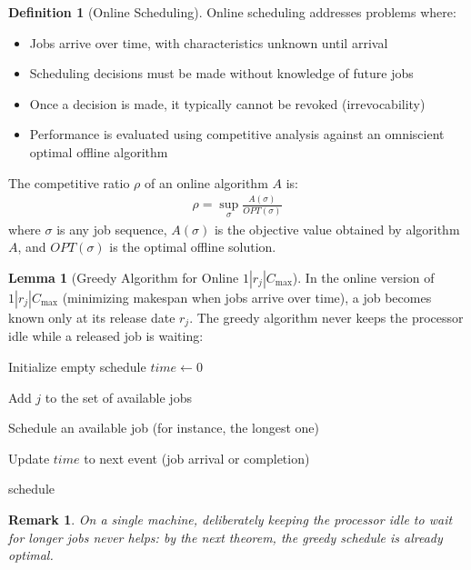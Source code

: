 \documentclass{article}
\newtheorem{remark}{Remark}
\theoremstyle{definition}
\newtheorem{lemma}{Lemma}
\newtheorem{definition}{Definition}
\begin{document}
\begin{definition}[Online Scheduling]
Online scheduling addresses problems where:
\begin{itemize}
    \item Jobs arrive over time, with characteristics unknown until arrival
    \item Scheduling decisions must be made without knowledge of future jobs
    \item Once a decision is made, it typically cannot be revoked (irrevocability)
    \item Performance is evaluated using competitive analysis against an omniscient optimal offline algorithm
\end{itemize}

The competitive ratio $\rho$ of an online algorithm $A$ is:
\begin{align}
\rho = \sup_{\sigma} \frac{A(\sigma)}{OPT(\sigma)}
\end{align}
where $\sigma$ is any job sequence, $A(\sigma)$ is the objective value obtained by algorithm $A$, and $OPT(\sigma)$ is the optimal offline solution.
\end{definition}

\begin{lemma}[Greedy Algorithm for Online $1|r_j|C_{\max}$]
In the online version of $1|r_j|C_{\max}$ (minimizing makespan when jobs arrive over time), a job becomes known only at its release date $r_j$. The greedy algorithm never keeps the processor idle while a released job is waiting:

\begin{algorithm}
\caption{Greedy Online Scheduling}
\begin{algorithmic}[1]
    \State Initialize empty schedule
    \State $time \gets 0$
    
            \State Add $j$ to the set of available jobs
        \EndIf
        
            \State Schedule an available job (for instance, the longest one)
        \EndIf
        
        \State Update $time$ to next event (job arrival or completion)
    \EndWhile
    
    \State \Return schedule
\EndProcedure
\end{algorithmic}
\end{algorithm}

\begin{remark}
On a single machine, deliberately keeping the processor idle to wait for longer jobs never helps: by the next theorem, the greedy schedule is already optimal.
\end{remark}
\end{lemma}
\end{document}
